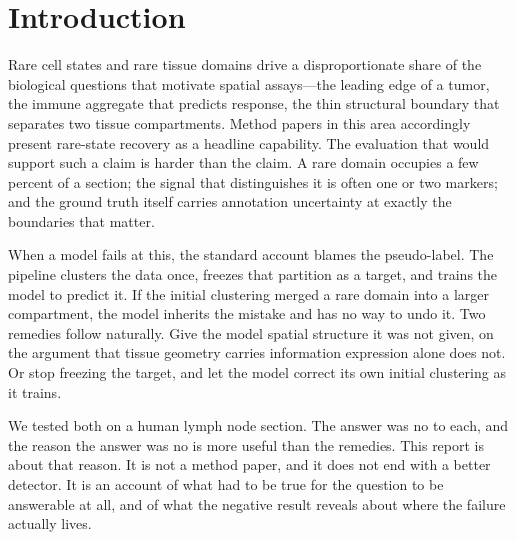 \documentclass[twocolumn,10pt]{article}
\begin{document}
\begin{abstract}
Two findings transfer beyond this dataset. A rare-domain F1 of zero under a 5-way partition is not a cluster-count limitation: the attainable value over merges of the annotation is 1.0000, and the endpoint is pinned by whether the initial partition happens to contain a cluster below the rarity threshold, which is a property of the partition rather than of the model. And a null result measured under a frozen target is guaranteed by the design, not discovered from the data, a hazard we argue is general rather than specific to this pipeline. We report all negative outcomes alongside the run artifacts and seeds needed to verify them.

\vspace{0.6em}
\noindent\textbf{Keywords:} spatial transcriptomics, rare cell detection, negative results, evaluation methodology, pseudo-labeling, graph neural networks
\end{abstract}

\section{Introduction}

Rare cell states and rare tissue domains drive a disproportionate share of the biological questions that motivate spatial assays---the leading edge of a tumor, the immune aggregate that predicts response, the thin structural boundary that separates two tissue compartments. Method papers in this area accordingly present rare-state recovery as a headline capability. The evaluation that would support such a claim is harder than the claim. A rare domain occupies a few percent of a section; the signal that distinguishes it is often one or two markers; and the ground truth itself carries annotation uncertainty at exactly the boundaries that matter.

When a model fails at this, the standard account blames the pseudo-label. The pipeline clusters the data once, freezes that partition as a target, and trains the model to predict it. If the initial clustering merged a rare domain into a larger compartment, the model inherits the mistake and has no way to undo it. Two remedies follow naturally. Give the model spatial structure it was not given, on the argument that tissue geometry carries information expression alone does not. Or stop freezing the target, and let the model correct its own initial clustering as it trains.

We tested both on a human lymph node section. The answer was no to each, and the reason the answer was no is more useful than the remedies. This report is about that reason. It is not a method paper, and it does not end with a better detector. It is an account of what had to be true for the question to be answerable at all, and of what the negative result reveals about where the failure actually lives.
\end{document}
